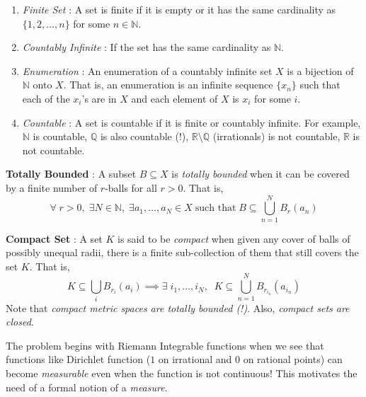 \documentclass{article}
\theoremstyle{definition}
\theoremstyle{remark}
\theoremstyle{definition}
\theoremstyle{definition}
\theoremstyle{definition}
\newcommand{\bunion}{\bigcup}
\newcommand{\R}{\mathbb{R}}
\newcommand{\N}{\mathbb{N}}
\newcommand{\Q}{\mathbb{Q}}
\begin{document}
\begin{itemize}
{\begin{enumerate}
	\item{\emph{Finite Set} : A set is finite if it is empty or it has the same cardinality as $ \{1,2,\dots,n\} $ for some $ n\in \N $.}
	\item{\emph{Countably Infinite} : If the set has the same cardinality as $ \N $.}
	\item {\emph{Enumeration} : An enumeration of a countably infinite set $ X $ is a bijection of $ \N $ onto $ X $. That is, an enumeration is an infinite sequence $ \{x_n\} $ such that each of the $ x_i $'s are in $ X $ and each element of $ X $ is $ x_i $ for some $ i $.}
	\item {\emph{Countable} : A set is countable if it is finite or countably infinite. For example, $ \N $ is countable, $ \Q $ is also countable (!), $ \R \setminus \Q $ (irrationals) is not countable, $ \R $ is not countable.}
\end{enumerate}	
\item {\textbf{Totally Bounded} : A subset $ B\subseteq X $ is \emph{totally bounded} when it can be covered by a finite number of $ r $-balls for all $ r>0 $. That is,
\[\forall \; r > 0,\;\exists N\in \N,\;\exists a_1,\dots,a_N\in X\;\text{such that}\;B\subseteq \bunion_{n=1}^N B_{r}(a_n)\]
}
\item{\textbf{Compact Set} : A set $ K $ is said to be \emph{compact} when given any cover of balls of possibly unequal radii, there is a finite sub-collection of them that still covers the set $ K $. That is,
\[K\subseteq \bunion_{i}B_{r_i}(a_i)\implies \exists \;i_1,\dots,i_N,\;\;K \subseteq \bunion_{n=1}^N B_{r_{i_n}}(a_{i_n})\]
Note that \emph{compact metric spaces are totally bounded (!)}. Also, \emph{compact sets are closed}.
}
} 
\end{itemize}
The problem begins with Riemann Integrable functions when we see that functions like Dirichlet function ($ 1 $ on  irrational and $ 0 $ on rational points) can become \emph{measurable} even when the function is not continuous! This motivates the need of a formal notion of a \emph{measure}.
\end{document}
